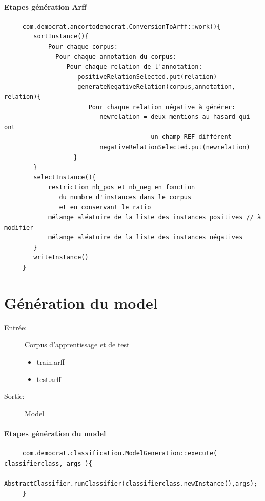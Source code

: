 \documentclass[a4paper,10pt]{report}
\begin{document}
    \paragraph{Etapes génération Arff}
    \begin{verbatim}
     com.democrat.ancortodemocrat.ConversionToArff::work(){
        sortInstance(){
            Pour chaque corpus:
              Pour chaque annotation du corpus:
                 Pour chaque relation de l'annotation:
                    positiveRelationSelected.put(relation)
                    generateNegativeRelation(corpus,annotation, relation){
                       Pour chaque relation négative à générer:
                          newrelation = deux mentions au hasard qui ont
                                        un champ REF différent
                          negativeRelationSelected.put(newrelation)                                 
                   }
        }
        selectInstance(){
            restriction nb_pos et nb_neg en fonction 
               du nombre d'instances dans le corpus 
               et en conservant le ratio
            mélange aléatoire de la liste des instances positives // à modifier
            mélange aléatoire de la liste des instances négatives            
        }
        writeInstance()       
     }
    \end{verbatim}

  
  \section{Génération du model}
    \begin{description}
     \item[Entrée:] Corpus d'apprentissage et de test
     \begin{itemize}
	  \item train.arff 
	  \item test.arff
     \end{itemize}
     \item[Sortie:] Model
    \end{description}
    \paragraph{Etapes génération du model}
    \begin{verbatim}
     com.democrat.classification.ModelGeneration::execute( classifierclass, args ){
         AbstractClassifier.runClassifier(classifierclass.newInstance(),args);
     }
    \end{verbatim}
    
\end{document}
